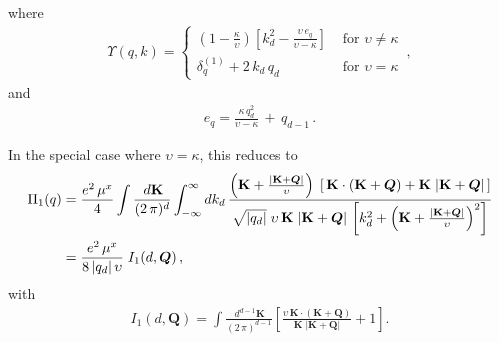 where
\begin{align}
\Upsilon(q,k) =  \begin{cases}
\left (1 - \frac {\kappa} {\upsilon} \right)
\left [ k_d^2 - \frac {\upsilon \, e_q}
{  \upsilon - \kappa  } \right ]
& \text{ for } \upsilon \neq \kappa \\
 \delta_q^{(1)} + 2\, k_d \, q_d 
& \text{ for } \upsilon = \kappa 
\end{cases} \,,
\end{align}
and
\begin{align}
e_q = \frac {\kappa \,  q_d^2} 
{\upsilon  - \kappa  }   \,
+ \,q_ {d-1} \,.
\end{align}

In the special case where $\upsilon = \kappa$, this reduces to
\begin{align}
\label{eqPi1}
\Pi_1 (q)  & = \frac{e^2 \, \mu^{x}} {4} 
\int  \frac{  \, d\mathbf  K}{(2 \, \pi)^d} 
\int_{-\infty }^\infty dk_d \,
\frac{ \left(  {\mathbf  K}
+ \frac{|\mathbf  K + {\boldsymbol Q}|} {\upsilon}  \right) 
\; \left[ \,\mathbf  K \cdot (\mathbf  K +{\boldsymbol Q}) 
+ {\mathbf  K}\; |\mathbf  K +{\boldsymbol Q}| \,  \right]  
}
{\sqrt {|q_d |}\; \upsilon \, {\mathbf  K}\; |\mathbf  K +{\boldsymbol Q}|\,
\left[   k_d^2 +  \left ( {\mathbf  K}
+\frac{ |\mathbf  K +{\boldsymbol Q}|} {\upsilon} \right)^2
\right ] }   
 \nonumber \\ & = \frac{e^2 \, \mu^{x}} { 8 \, |q_d| \, \upsilon } 
\; I_1 (d, {\boldsymbol Q}) \, ,
\end{align}
with
\begin{align}
\label{eqi1}
I_1 (d, {\boldsymbol Q}) = \int  \frac{  \, d^{d-1}\mathbf  K}{(2 \, \pi)^{d-1} } 
\left[ \frac{ \upsilon\,
 \mathbf  K \cdot (\mathbf  K +{\boldsymbol Q}) }
{ {\mathbf  K}\; |\mathbf  K +{\boldsymbol Q}|}
+ 1 \right ] . 
 \end{align}


